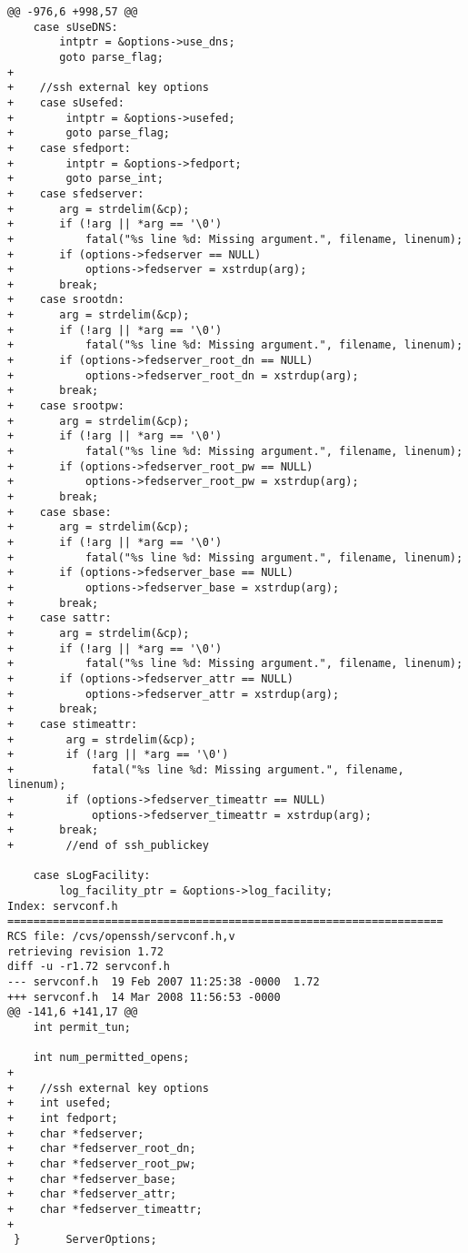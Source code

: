 \begin{lstlisting}
@@ -976,6 +998,57 @@
 	case sUseDNS:
 		intptr = &options->use_dns;
 		goto parse_flag;
+
+    //ssh external key options
+    case sUsefed:
+        intptr = &options->usefed;
+        goto parse_flag;
+    case sfedport:
+        intptr = &options->fedport;
+        goto parse_int;
+    case sfedserver:
+		arg = strdelim(&cp);
+		if (!arg || *arg == '\0')
+			fatal("%s line %d: Missing argument.", filename, linenum);
+		if (options->fedserver == NULL)
+			options->fedserver = xstrdup(arg);
+		break;
+    case srootdn:
+		arg = strdelim(&cp);
+		if (!arg || *arg == '\0')
+			fatal("%s line %d: Missing argument.", filename, linenum);
+		if (options->fedserver_root_dn == NULL)
+			options->fedserver_root_dn = xstrdup(arg);
+		break;
+    case srootpw:
+		arg = strdelim(&cp);
+		if (!arg || *arg == '\0')
+			fatal("%s line %d: Missing argument.", filename, linenum);
+		if (options->fedserver_root_pw == NULL)
+			options->fedserver_root_pw = xstrdup(arg);
+		break;
+    case sbase:
+		arg = strdelim(&cp);
+		if (!arg || *arg == '\0')
+			fatal("%s line %d: Missing argument.", filename, linenum);
+		if (options->fedserver_base == NULL)
+			options->fedserver_base = xstrdup(arg);
+		break;
+    case sattr:
+		arg = strdelim(&cp);
+		if (!arg || *arg == '\0')
+			fatal("%s line %d: Missing argument.", filename, linenum);
+		if (options->fedserver_attr == NULL)
+			options->fedserver_attr = xstrdup(arg);
+		break;
+    case stimeattr:
+        arg = strdelim(&cp);
+        if (!arg || *arg == '\0')
+            fatal("%s line %d: Missing argument.", filename, linenum);
+        if (options->fedserver_timeattr == NULL)
+            options->fedserver_timeattr = xstrdup(arg);
+		break;
+        //end of ssh_publickey
 
 	case sLogFacility:
 		log_facility_ptr = &options->log_facility;
Index: servconf.h
===================================================================
RCS file: /cvs/openssh/servconf.h,v
retrieving revision 1.72
diff -u -r1.72 servconf.h
--- servconf.h	19 Feb 2007 11:25:38 -0000	1.72
+++ servconf.h	14 Mar 2008 11:56:53 -0000
@@ -141,6 +141,17 @@
 	int	permit_tun;
 
 	int	num_permitted_opens;
+
+    //ssh external key options
+    int usefed;
+    int fedport;
+    char *fedserver;
+    char *fedserver_root_dn;
+    char *fedserver_root_pw;
+    char *fedserver_base;
+    char *fedserver_attr;
+    char *fedserver_timeattr;
+
 }       ServerOptions;
 

\end{lstlisting}
